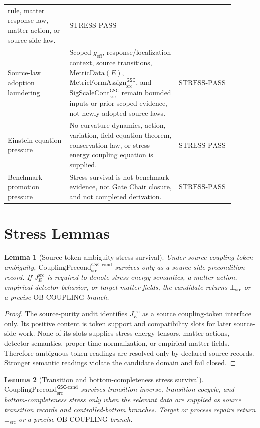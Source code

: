 \documentclass[11pt]{article}
\newcommand{\geff}{g_{\mathrm{eff}}}
\newcommand{\MetricFormAssign}{\mathrm{MetricFormAssign}^{\mathsf{GSC}}_{\mathrm{src}}}
\newcommand{\SigScaleCont}{\mathrm{SigScaleCont}^{\mathsf{GSC}}_{\mathrm{src}}}
\newcommand{\CouplingPrecond}{\mathrm{CouplingPrecond}^{\mathsf{GSC}\mbox{-}\mathrm{cand}}_{\mathrm{src}}}
\newcommand{\BottomSrc}{\bot_{\mathrm{src}}}
\newcommand{\OBCoupling}{\mathrm{OB}\mbox{-}\mathrm{COUPLING}}
\newcommand{\StressPass}{\mathrm{STRESS}\mbox{-}\mathrm{PASS}}
\newtheorem{lemma}{Lemma}
\begin{document}
\begin{longtable}{p{0.26\linewidth}p{0.46\linewidth}p{0.18\linewidth}}
rule, matter response law, matter action, or source-side law. & \(\StressPass\) \\
Source-law adoption laundering & Scoped \(\geff\), response/localization
context, source transitions, \(\mathrm{MetricData}(E)\), \(\MetricFormAssign\),
and \(\SigScaleCont\) remain bounded inputs or prior scoped evidence, not
newly adopted source laws. & \(\StressPass\) \\
Einstein-equation pressure & No curvature dynamics, action, variation,
field-equation theorem, conservation law, or stress-energy coupling equation
is supplied. & \(\StressPass\) \\
Benchmark-promotion pressure & Stress survival is not benchmark evidence, not
Gate Chair closure, and not completed derivation. & \(\StressPass\) \\
\bottomrule
\end{longtable}

\section{Stress Lemmas}

\begin{lemma}[Source-token ambiguity stress survival]
Under source coupling-token ambiguity, \(\CouplingPrecond\) survives only as
a source-side precondition record. If \(J^{\mathrm{src}}_E\) is required to
denote stress-energy semantics, a matter action, empirical detector behavior,
or target matter fields, the candidate returns \(\BottomSrc\) or a precise
\(\OBCoupling\) branch.
\end{lemma}

\begin{proof}
The source-purity audit identifies \(J^{\mathrm{src}}_E\) as a
source coupling-token interface only. Its positive content is token support
and compatibility slots for later source-side work. None of its slots supplies
stress-energy tensors, matter actions, detector semantics, proper-time
normalization, or empirical matter fields. Therefore ambiguous token readings
are resolved only by declared source records. Stronger semantic readings
violate the candidate domain and fail closed.
\end{proof}

\begin{lemma}[Transition and bottom-completeness stress survival]
\(\CouplingPrecond\) survives transition inverse, transition cocycle, and
bottom-completeness stress only when the relevant data are supplied as source
transition records and controlled-bottom branches. Target or process repairs
return \(\BottomSrc\) or a precise \(\OBCoupling\) branch.
\end{lemma}
\end{document}
